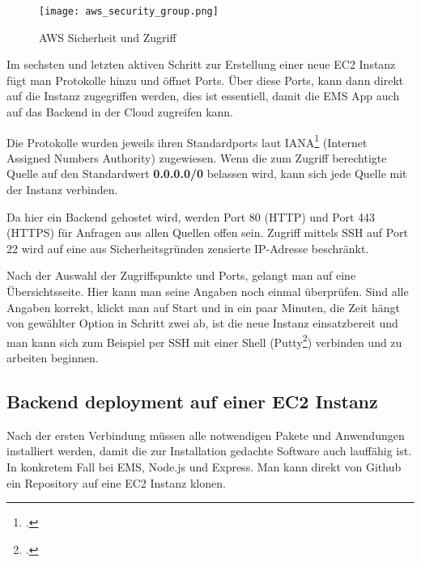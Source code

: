 \begin{center}
\begin{figure}[H]
    \centering
    \texttt{[image: aws\_security\_group.png]}
    \caption{AWS Sicherheit und Zugriff}
\end{figure}
\end{center}
Im sechsten und letzten aktiven Schritt zur Erstellung einer neue EC2 Instanz fügt man Protokolle hinzu und öffnet Ports. Über diese Ports, kann dann direkt auf die Instanz zugegriffen werden, dies ist essentiell, damit die EMS App auch auf das Backend in der Cloud zugreifen kann.

Die Protokolle wurden jeweils ihren Standardports laut IANA\footcite{iana} (Internet Assigned Numbers Authority) zugewiesen. Wenn die zum Zugriff berechtigte Quelle auf den Standardwert \textbf{0.0.0.0/0} belassen wird, kann sich jede Quelle mit der Instanz verbinden.

Da hier ein Backend gehostet wird, werden Port 80 (HTTP) und Port 443 (HTTPS) für Anfragen aus allen Quellen offen sein. Zugriff mittels SSH auf Port 22 wird auf eine aus Sicherheitsgründen zensierte IP-Adresse beschränkt.

Nach der Auswahl der Zugriffspunkte und Ports, gelangt man auf eine Übersichtsseite. Hier kann man seine Angaben noch einmal überprüfen. Sind alle Angaben korrekt, klickt man auf Start und in ein paar Minuten, die Zeit hängt von gewählter Option in Schritt zwei ab, ist die neue Instanz einsatzbereit und man kann sich zum Beispiel per SSH mit einer Shell (Putty\footcite{putty}) verbinden und zu arbeiten beginnen.

\subsection{Backend deployment auf einer EC2 Instanz}
Nach der ersten Verbindung müssen alle notwendigen Pakete und Anwendungen installiert werden, damit die zur Installation gedachte Software auch lauffähig ist.
In konkretem Fall bei EMS, Node.js und Express. Man kann direkt von Github ein Repository auf eine EC2 Instanz klonen. 


